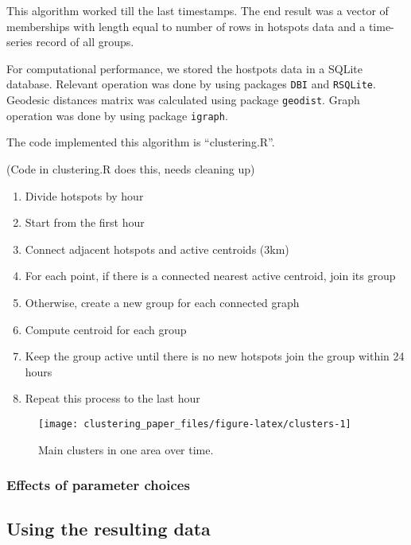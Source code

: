 This algorithm worked till the last timestamps. The end result was a
vector of memberships with length equal to number of rows in hotspots
data and a time-series record of all groups.

For computational performance, we stored the hostpots data in a SQLite
database. Relevant operation was done by using packages \texttt{DBI} and
\texttt{RSQLite}. Geodesic distances matrix was calculated using package
\texttt{geodist}. Graph operation was done by using package
\texttt{igraph}.

The code implemented this algorithm is ``clustering.R''.

(Code in clustering.R does this, needs cleaning up)

\begin{enumerate}
\def\labelenumi{\arabic{enumi}.}
\tightlist
\item
  Divide hotspots by hour
\item
  Start from the first hour
\item
  Connect adjacent hotspots and active centroids (3km)
\item
  For each point, if there is a connected nearest active centroid, join
  its group
\item
  Otherwise, create a new group for each connected graph
\item
  Compute centroid for each group
\item
  Keep the group active until there is no new hotspots join the group
  within 24 hours
\item
  Repeat this process to the last hour
\end{enumerate}

\begin{Schunk}
\begin{figure}
\texttt{[image: clustering\_paper\_files/figure-latex/clusters-1]} \caption[Main clusters in one area over time]{Main clusters in one area over time.}\label{fig:clusters}
\end{figure}
\end{Schunk}

\hypertarget{effects-of-parameter-choices}{%
\subsubsection{Effects of parameter
choices}\label{effects-of-parameter-choices}}

\hypertarget{using-the-resulting-data}{%
\subsection{Using the resulting data}\label{using-the-resulting-data}}

